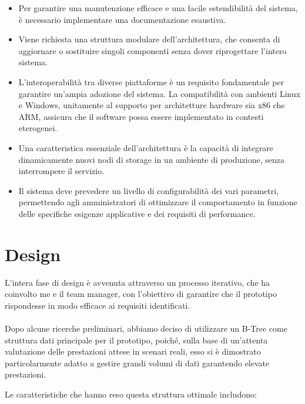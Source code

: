 \documentclass[12pt,a4paper,openright,twoside]{book}
\begin{document}
            \begin{itemize}
                \item Per garantire una manutenzione efficace e una facile estendibilità del sistema, è necessario implementare una documentazione esaustiva.
                \item Viene richiesta una struttura modulare dell’architettura, che consenta di aggiornare o sostituire singoli componenti senza dover riprogettare l’intero sistema.
                \item L’interoperabilità tra diverse piattaforme è un requisito fondamentale per garantire un’ampia adozione del sistema. La compatibilità con ambienti Linux e Windows, unitamente al supporto per architetture hardware sia x86 che ARM, assicura che il software possa essere implementato in contesti eterogenei.
                \item Una caratteristica essenziale dell’architettura è la capacità di integrare dinamicamente nuovi nodi di storage in un ambiente di produzione, senza interrompere il servizio.
                \item Il sistema deve prevedere un livello di configurabilità dei vari parametri, permettendo agli amministratori di ottimizzare il comportamento in funzione delle specifiche esigenze applicative e dei requisiti di performance.
            \end{itemize}

    \section{Design}

        L'intera fase di design è avvenuta attraverso un processo iterativo, che ha coinvolto me e il team manager, con l'obiettivo di garantire che il prototipo rispondesse in modo efficace ai requisiti identificati.

        \paragraph*{}

        Dopo alcune ricerche preliminari, abbiamo deciso di utilizzare un B-Tree come struttura dati principale per il prototipo, poiché, sulla base di un'attenta valutazione delle prestazioni attese in scenari reali, esso si è dimostrato particolarmente adatto a gestire grandi volumi di dati garantendo elevate prestazioni.

        Le caratteristiche che hanno reso questa struttura ottimale includono:
\end{document}
